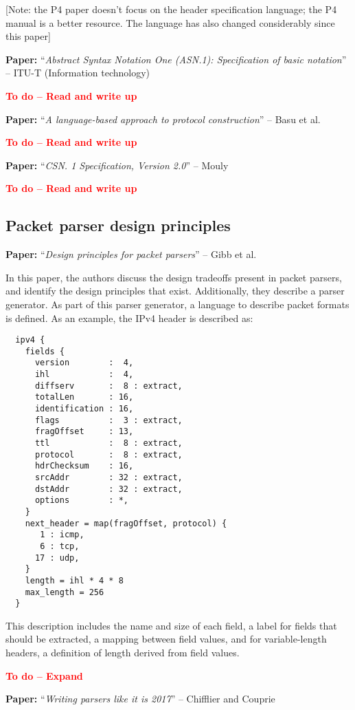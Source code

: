 \documentclass[10pt]{article}
\newcommand{\todo}[1]{\textbf{\textcolor{red}{To do -- #1}}}
\newcommand{\paper}[3]{\vspace{4mm}\noindent\textbf{Paper:} ``\textit{#1}'' -- #2 \cite{#3}\vspace{3mm}}
\begin{document}
[Note: the P4 paper doesn't focus on the header specification language; the P4 manual is
a better resource. The language has also changed considerably since this paper]

\paper{Abstract Syntax Notation One (ASN.1): Specification of basic notation}{ITU-T (Information technology)}{x680}

\todo{Read and write up}

\paper{A language-based approach to protocol construction}{Basu et al.}{basu1997language}

\todo{Read and write up}

\paper{CSN. 1 Specification, Version 2.0}{Mouly}{mouly1998csn}

\todo{Read and write up}

\subsection{Packet parser design principles}
\paper{Design principles for packet parsers}{Gibb et al.}{gibb2013design}

In this paper, the authors discuss the design tradeoffs present in packet parsers, and
identify the design principles that exist. Additionally, they describe a parser generator.
As part of this parser generator, a language to describe packet formats is defined.
As an example, the IPv4 header is described as:

\begin{verbatim}
  ipv4 {
    fields {
      version        :  4,
      ihl            :  4,
      diffserv       :  8 : extract,
      totalLen       : 16,
      identification : 16,
      flags          :  3 : extract,
      fragOffset     : 13,
      ttl            :  8 : extract,
      protocol       :  8 : extract,
      hdrChecksum    : 16,
      srcAddr        : 32 : extract,
      dstAddr        : 32 : extract,
      options        : *,
    }
    next_header = map(fragOffset, protocol) {
       1 : icmp,
       6 : tcp,
      17 : udp,
    }
    length = ihl * 4 * 8
    max_length = 256
  }
\end{verbatim}

This description includes the name and size of each field, a label for fields that should
be extracted, a mapping between field values, and for variable-length headers, a
definition of length derived from field values.

\todo{Expand}

\paper{Writing parsers like it is 2017}{Chifflier and Couprie}{chifflier2017writing}
\end{document}
